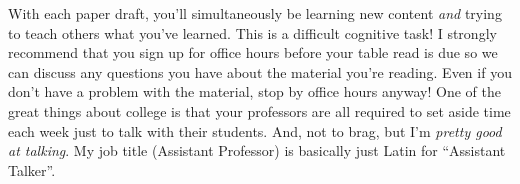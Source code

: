 \documentclass[11pt, letterpaper]{article}
\begin{document}
With each paper draft, you'll simultaneously be learning new content \textit{and} trying to teach others what you've learned. This is a difficult cognitive task! I strongly recommend that you sign up for office hours before your table read is due so we can discuss any questions you have about the material you're reading. Even if you don't have a problem with the material, stop by office hours anyway! One of the great things about college is that your professors are all required to set aside time each week just to talk with their students. And, not to brag, but I'm \textit{pretty good at talking}. My job title (Assistant Professor) is basically just Latin for ``Assistant Talker''.

%
%
%
\end{document}

